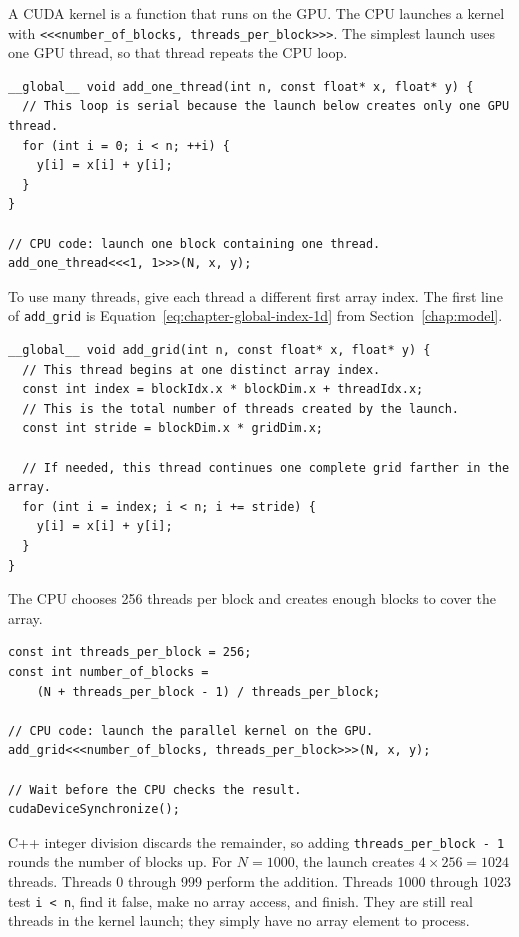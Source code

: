 \documentclass[11pt]{article}
\numberwithin{equation}{section}
\numberwithin{figure}{section}
\numberwithin{table}{section}
\newcommand{\code}[1]{\texttt{#1}}
\begin{document}
A CUDA kernel is a function that runs on the GPU.  The CPU launches a kernel with
\code{<<<number\_of\_blocks, threads\_per\_block>>>}.  The simplest launch uses one
GPU thread, so that thread repeats the CPU loop.
\begin{lstlisting}[language=CUDA,caption={One GPU thread processes the whole array.}]
__global__ void add_one_thread(int n, const float* x, float* y) {
  // This loop is serial because the launch below creates only one GPU thread.
  for (int i = 0; i < n; ++i) {
    y[i] = x[i] + y[i];
  }
}

// CPU code: launch one block containing one thread.
add_one_thread<<<1, 1>>>(N, x, y);
\end{lstlisting}

To use many threads, give each thread a different first array index.  The first line
of \code{add\_grid} is Equation~\eqref{eq:chapter-global-index-1d} from
Section~\ref{chap:model}.
\begin{lstlisting}[language=CUDA,caption={Many GPU threads divide the array.}]
__global__ void add_grid(int n, const float* x, float* y) {
  // This thread begins at one distinct array index.
  const int index = blockIdx.x * blockDim.x + threadIdx.x;
  // This is the total number of threads created by the launch.
  const int stride = blockDim.x * gridDim.x;

  // If needed, this thread continues one complete grid farther in the array.
  for (int i = index; i < n; i += stride) {
    y[i] = x[i] + y[i];
  }
}
\end{lstlisting}

The CPU chooses 256 threads per block and creates enough blocks to cover the array.
\begin{lstlisting}[language=CUDA]
const int threads_per_block = 256;
const int number_of_blocks =
    (N + threads_per_block - 1) / threads_per_block;

// CPU code: launch the parallel kernel on the GPU.
add_grid<<<number_of_blocks, threads_per_block>>>(N, x, y);

// Wait before the CPU checks the result.
cudaDeviceSynchronize();
\end{lstlisting}
C++ integer division discards the remainder, so adding
\code{threads\_per\_block - 1} rounds the number of blocks up.  For \(N=1000\),
the launch creates \(4\times256=1024\) threads.  Threads 0 through 999 perform the
addition.  Threads 1000 through 1023 test \code{i < n}, find it false, make no array
access, and finish.  They are still real threads in the kernel launch; they simply
have no array element to process.
\end{document}
